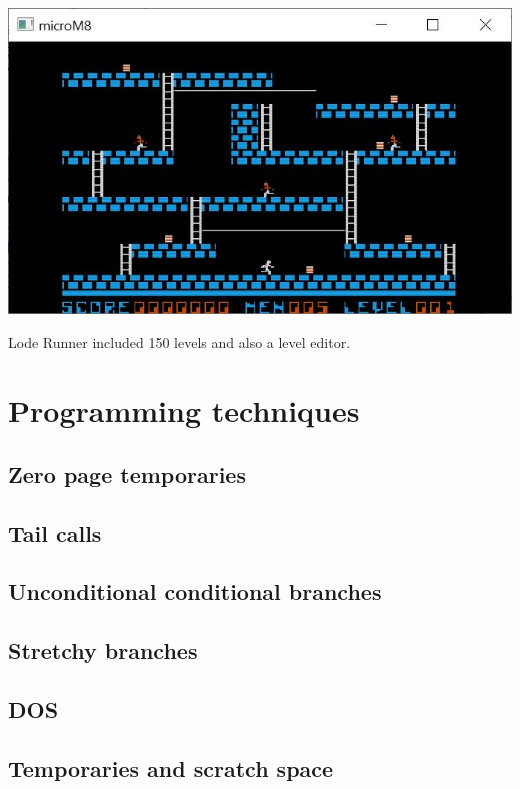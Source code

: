 \documentclass[10pt]{report}%
\begin{document}
\begin{center}
\includegraphics[width=\columnwidth]{screen}
\end{center}

Lode Runner included 150 levels and also a level editor.

\chapter{Programming techniques}

\section{Zero page temporaries}

\section{Tail calls}

\section{Unconditional conditional branches}

\section{Stretchy branches}

\section{DOS}

\section{Temporaries and scratch space}
\end{document}
